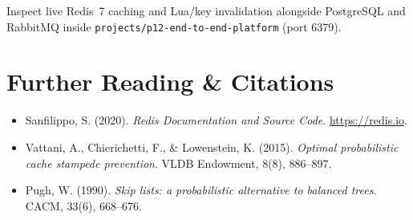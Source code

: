 \begin{labbridgebox}
Inspect live Redis~7 caching and Lua/key invalidation alongside PostgreSQL and RabbitMQ inside \texttt{projects/p12-end-to-end-platform} (port 6379).
\end{labbridgebox}

\section{Further Reading \protect\& Citations}
\begin{itemize}[leftmargin=18pt]
  \item Sanfilippo, S. (2020). \emph{Redis Documentation and Source Code}. \url{https://redis.io}.
  \item Vattani, A., Chierichetti, F., \& Lowenstein, K. (2015). \emph{Optimal probabilistic cache stampede prevention}. VLDB Endowment, 8(8), 886--897.
  \item Pugh, W. (1990). \emph{Skip lists: a probabilistic alternative to balanced trees}. CACM, 33(6), 668--676.
\end{itemize}
